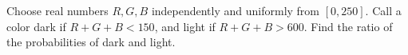 Choose real numbers $ R,G,B $ independently and uniformly from $[0,250]$. Call a color dark if $ R+G+B<150 $, and light if $ R+G+B>600 $. Find the ratio of the probabilities of dark and light.
